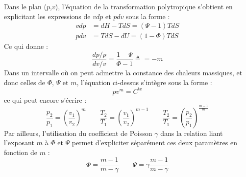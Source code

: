 Dans le plan ($p$,$v$), l'équation de la transformation polytropique s'obtient en explicitant les expressions de $vdp$ et $pdv$ sous la forme :
\begin{align} vdp &= dH-TdS = (\Psi - 1)TdS \\ pdv &= TdS - dU = (1-\Phi)TdS \end{align}
Ce qui donne :
\begin{equation} \frac{dp/p}{dv/v} = \frac{1-\Psi}{\Phi-1} \triangleq = -m \end{equation}
Dans un intervalle où on peut admettre la constance des chaleurs massiques, et donc celles de $\Phi$, $\Psi$ et $m$, l'équation ci-dessus s'intègre sous la forme :
\begin{equation} pv^m = C^\text{te}\end{equation}
ce qui peut encore s'écrire :
\begin{equation} \frac{p_2}{p_1} = \left(\frac{v_1}{v_2}\right)^{m} \qquad \frac{T_2}{T_1} = \left(\frac{v_1}{v_2}\right)^{m-1} \qquad \frac{T_2}{T_1} = \left(\frac{p_2}{p_1}\right)^{\frac{m-1}{m}} \end{equation}
Par ailleurs, l'utilisation du coefficient de Poisson $\gamma$ dans la relation liant l'exposant $m$ à $\Phi$ et $\Psi$ permet d'expliciter séparément ces deux paramètres en fonction de $m$ :
\begin{equation} \Phi = \frac{m-1}{m-\gamma} \qquad \Psi = \gamma\frac{m-1}{m-\gamma} \end{equation}

